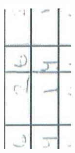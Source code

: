 \documentclass[10pt]{article}
\begin{document}
\includegraphics[max width=\textwidth, center]{2025_02_27_dd68c3d38de88f0516d9g-019(9)}\\
\end{document}
